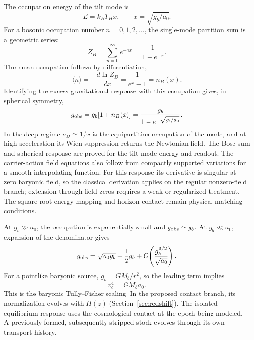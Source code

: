 The occupation energy of the tilt mode is
\begin{equation}
E=k_BT_H x,\qquad x=\sqrt{g_b/a_0}.
\label{eq:thermalenergy}
\end{equation}
For a bosonic occupation number $n=0,1,2,\ldots$, the single-mode partition
sum is a geometric series:
\begin{equation}
Z_B=\sum_{n=0}^\infty e^{-nx}=\frac1{1-e^{-x}}.
\end{equation}
The mean occupation follows by differentiation,
\begin{equation}
\langle n\rangle=-\frac{d\ln Z_B}{dx}
=\frac1{e^x-1}=n_B(x).
\end{equation}
Identifying the excess gravitational response with this occupation gives,
in spherical symmetry,
\begin{equation}
g_{\rm obs}=g_b[1+n_B(x)]
=\frac{g_b}{1-e^{-\sqrt{g_b/a_0}}}.
\label{eq:rar}
\end{equation}
In the deep regime $n_B\simeq1/x$ is the equipartition occupation of the
mode, and at high acceleration its Wien suppression returns the Newtonian
field. The Bose sum and spherical response are proved for the tilt-mode
energy and readout. The carrier-action field equations also follow from
compactly supported variations for a smooth interpolating function.
For this response its derivative is singular at zero baryonic field,
so the classical derivation applies on the regular nonzero-field branch;
extension through field zeros requires a weak or regularized treatment.
The square-root energy mapping and horizon contact remain physical
matching conditions. 

At $g_b\gg a_0$, the occupation is exponentially small and
$g_{\rm obs}\simeq g_b$. At $g_b\ll a_0$, expansion of the denominator gives
\begin{equation}
g_{\rm obs}=\sqrt{a_0g_b}+\frac12g_b
+O\!\left(\frac{g_b^{3/2}}{\sqrt{a_0}}\right).
\end{equation}
For a pointlike baryonic source, $g_b=GM_b/r^2$, so the leading term implies
\begin{equation}
v_c^4=GM_ba_0.
\end{equation}
This is the baryonic Tully--Fisher scaling. In the proposed contact branch,
its normalization evolves with $H(z)$ (Section~\ref{sec:redshift}). The isolated equilibrium response
uses the cosmological contact at the epoch being modeled. A previously
formed, subsequently stripped stock evolves through its own transport history.

